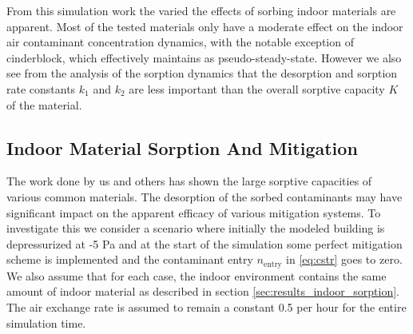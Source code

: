 From this simulation work the varied the effects of sorbing indoor materials are apparent.
Most of the tested materials only have a moderate effect on the indoor air contaminant concentration dynamics, with the notable exception of cinderblock, which effectively maintains as pseudo-steady-state.
However we also see from the analysis of the sorption dynamics that the desorption and sorption rate constants $k_1$ and $k_2$ are less important than the overall sorptive capacity $K$ of the material.\par

\subsection{Indoor Material Sorption And Mitigation}\label{sec:results_indoor_mitigation}

The work done by us and others has shown the large sorptive capacities of various common materials.
The desorption of the sorbed contaminants may have significant impact on the apparent efficacy of various mitigation systems.
To investigate this we consider a scenario where initially the modeled building is depressurized at -5 Pa and at the start of the simulation some perfect mitigation scheme is implemented and the contaminant entry $n_\mathrm{entry}$ in \eqref{eq:cstr} goes to zero.
We also assume that for each case, the indoor environment contains the same amount of indoor material as described in section \ref{sec:results_indoor_sorption}.
The air exchange rate is assumed to remain a constant 0.5 per hour for the entire simulation time.\par

